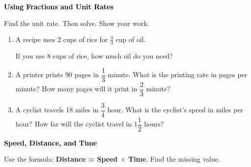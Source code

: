 \documentclass[12pt, letterpaper, fleqn]{article}
\begin{document}
\newpage

\begin{tcolorbox}[colback=customteal!20]
\large\textcolor{black}{\textbf{Using Fractions and Unit Rates}}
\end{tcolorbox}

\noindent
Find the unit rate. Then solve. Show your work.

\vspace{3mm}

\begin{enumerate}[itemsep=2.2cm, leftmargin=0.6cm]
\item A recipe uses 2 cups of rice for $\frac{3}{4}$ cup of oil.

If you use 8 cups of rice, how much oil do you need?

\vspace{2cm}
\item A printer prints 90 pages in $\dfrac{1}{3}$ minute. What is the printing rate in pages per minute? How many pages will it print in $\dfrac{2}{3}$ minute?\\
\vspace{2cm}

\item A cyclist travels 18 miles in $\dfrac{3}{4}$ hour. What is the cyclist's speed in miles per hour? How far will the cyclist travel in $1\dfrac{1}{2}$ hours?\\
\vspace{2cm}


\end{enumerate}

\newpage

\begin{tcolorbox}[colback=customteal!20]
\large\textcolor{black}{\textbf{Speed, Distance, and Time}}
\end{tcolorbox}

\noindent
Use the formula: \textbf{Distance = Speed $\times$ Time}. Find the missing value.

\vspace{3mm}
\end{document}
